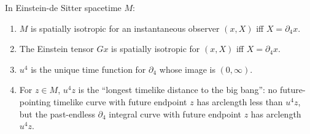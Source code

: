 In Einstein-de Sitter spacetime $M$:
\begin{enumerate}
  \item[(a)] $M$ is spatially isotropic for an instantaneous observer $(x, X)$ iff $X = \partial_4 x$.
  \item[(b)] The Einstein tensor $Gx$ is spatially isotropic for $(x, X)$ iff $X = \partial_4 x$.
  \item[(c)] $u^4$ is the unique time function for $\partial_4$ whose image is $(0, \infty)$.
  \item[(d)] For $z \in M$, $u^4 z$ is the ``longest timelike distance to the big bang'': no future-pointing timelike curve with future endpoint $z$ has arclength less than $u^4 z$, but the past-endless $\partial_4$ integral curve with future endpoint $z$ has arclength $u^4 z$.
\end{enumerate}
